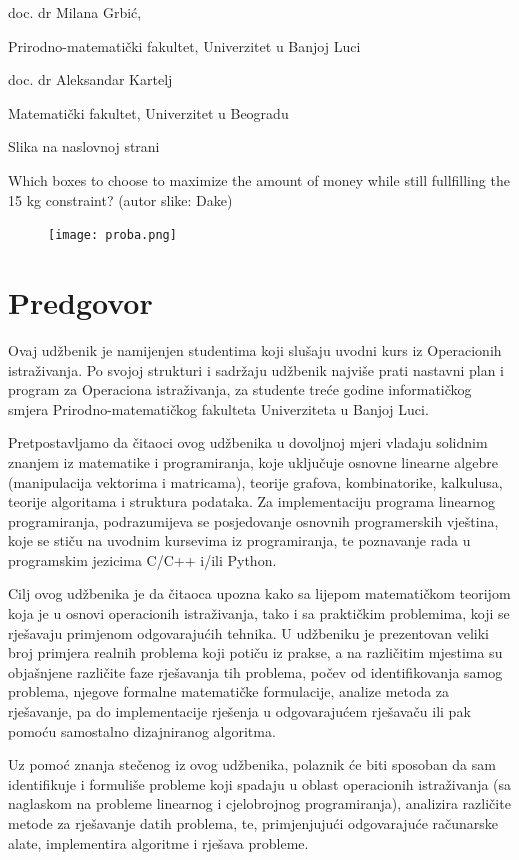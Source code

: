 \documentclass[b5paper, utf8, 11pt, colorlinks]{book}
\theoremstyle{definition}
\begin{document}
 doc. dr Milana Grbić,
 
 Prirodno-matematički fakultet, Univerzitet u Banjoj Luci
 
 doc. dr Aleksandar Kartelj
 
 Matematički fakultet, Univerzitet u Beogradu
 \vspace{1cm}
 
 Slika na naslovnoj strani
 
 Which boxes to choose to maximize the amount of money while still fullfilling the 15 kg constraint? (autor slike: Dake)
 
 \begin{figure}[h]
    \texttt{[image: proba.png]}
\end{figure}
\clearpage
{}
\chapter*{Predgovor}
Ovaj udžbenik je namijenjen studentima koji slušaju uvodni kurs iz Opera\-cionih istraživanja. Po svojoj strukturi i sadržaju udžbenik najviše prati nastavni plan i program za Operaciona istraživanja, za studente treće godine informatičkog smjera Prirodno-matematičkog fakulteta Univerziteta u Banjoj Luci.

Pretpostavljamo da čitaoci ovog udžbenika u dovoljnoj mjeri vladaju solidnim znanjem iz matematike i programiranja, koje uključuje osnovne linearne algebre (manipulacija vektorima i matricama), teorije grafova, kombinatorike, kalkulusa, teorije algoritama i struktura podataka. Za implementaciju programa linearnog programiranja, podrazumijeva se posjedovanje osnovnih programerskih vještina, koje se stiču na uvodnim kursevima iz programiranja, te poznavanje rada u  programskim jezicima C/C++ i/ili Python. 

Cilj ovog udžbenika je da čitaoca upozna kako sa lijepom matematičkom teorijom koja je u osnovi operacionih istraživanja, tako i sa praktičkim problemima, koji se rješavaju primjenom odgovarajućih tehnika. U udžbeniku je prezentovan veliki broj primjera realnih problema koji potiču iz prakse, a na različitim mjestima su objašnjene različite faze rješavanja tih problema, počev od  identifikovanja samog problema, njegove formalne matematičke formulacije, analize  metoda za rješavanje, pa do implementacije rješenja u odgovarajućem rješavaču ili pak pomoću samostalno dizajniranog algoritma. 


Uz pomoć znanja stečenog iz ovog udžbenika, polaznik će biti sposoban da sam identifikuje i formuliše probleme koji spadaju u oblast operacionih istraživanja (sa naglaskom na probleme linearnog i cjelobrojnog programiranja), analizira različite metode za rješavanje datih problema, te, primjenjujući odgovarajuće računarske alate, implementira algoritme i rješava probleme.
\end{document}
